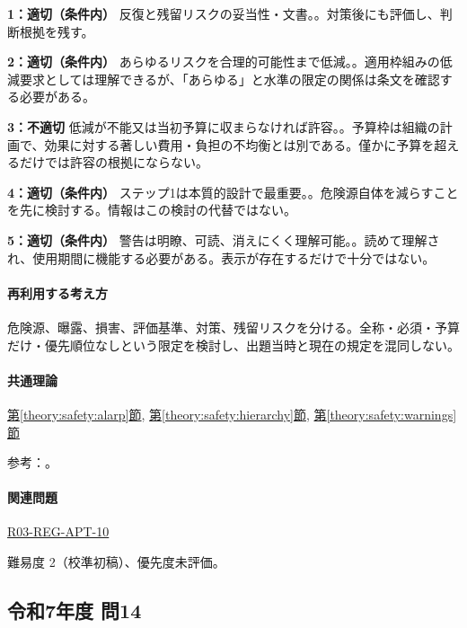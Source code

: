 \noindent\textbf{1：適切（条件内）} 反復と残留リスクの妥当性・文書。。対策後にも評価し、判断根拠を残す。\par

\noindent\textbf{2：適切（条件内）} あらゆるリスクを合理的可能性まで低減。。適用枠組みの低減要求としては理解できるが、「あらゆる」と水準の限定の関係は条文を確認する必要がある。\par

\noindent\textbf{3：不適切} 低減が不能又は当初予算に収まらなければ許容。。予算枠は組織の計画で、効果に対する著しい費用・負担の不均衡とは別である。僅かに予算を超えるだけでは許容の根拠にならない。\par

\noindent\textbf{4：適切（条件内）} ステップ1は本質的設計で最重要。。危険源自体を減らすことを先に検討する。情報はこの検討の代替ではない。\par

\noindent\textbf{5：適切（条件内）} 警告は明瞭、可読、消えにくく理解可能。。読めて理解され、使用期間に機能する必要がある。表示が存在するだけで十分ではない。\par

\paragraph{再利用する考え方} 危険源、曝露、損害、評価基準、対策、残留リスクを分ける。全称・必須・予算だけ・優先順位なしという限定を検討し、出題当時と現在の規定を混同しない。

\paragraph{共通理論} \hyperref[theory:safety:alarp]{第\ref*{theory:safety:alarp}節}, \hyperref[theory:safety:hierarchy]{第\ref*{theory:safety:hierarchy}節}, \hyperref[theory:safety:warnings]{第\ref*{theory:safety:warnings}節}

\par 参考：\cite{saf_ra2006,saf_parliament2006,saf_guide51}。

\paragraph{関連問題} \hyperref[q:r03-reg-apt-10]{R03-REG-APT-10}

\par 難易度 2（校準初稿）、優先度未評価。

\subsection{令和7年度 問14}
\label{q:r07-reg-apt-14}

